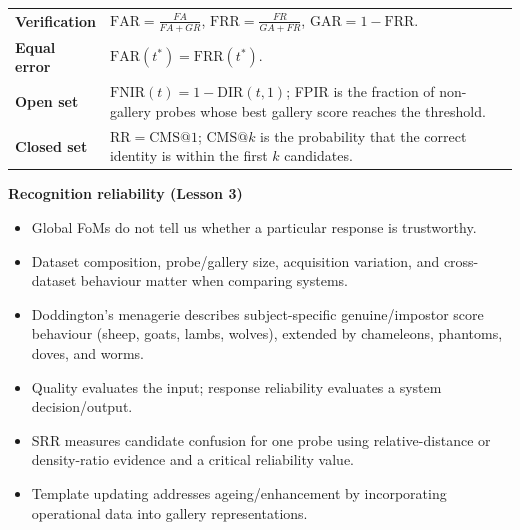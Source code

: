 \documentclass[11pt,a4paper,oneside]{report}
\begin{document}
\begin{remarkbox}
\small
\begin{tabularx}{\linewidth}{>{\bfseries}P{3.0cm} X}
Verification &
\(\displaystyle \mathrm{FAR}=\frac{FA}{FA+GR}\),\quad
\(\displaystyle \mathrm{FRR}=\frac{FR}{GA+FR}\),\quad
\(\mathrm{GAR}=1-\mathrm{FRR}\). \\
\addlinespace[2pt]
Equal error &
\(\mathrm{FAR}(t^\ast)=\mathrm{FRR}(t^\ast)\). \\
\addlinespace[2pt]
Open set &
\(\mathrm{FNIR}(t)=1-\mathrm{DIR}(t,1)\); FPIR is the fraction of non-gallery probes whose best gallery score reaches the threshold. \\
\addlinespace[2pt]
Closed set &
\(\mathrm{RR}=\mathrm{CMS}@1\); \(\mathrm{CMS}@k\) is the probability that the correct identity is within the first \(k\) candidates. \\
\end{tabularx}
\normalsize
\end{remarkbox}


\clearpage
\begin{keyconcept}
\textbf{Recognition reliability (Lesson 3)}
\begin{itemize}[leftmargin=*,itemsep=0.18em,topsep=0.25em]
    \item Global FoMs do not tell us whether a particular response is trustworthy.
    \item Dataset composition, probe/gallery size, acquisition variation, and cross-dataset behaviour matter when comparing systems.
    \item Doddington's menagerie describes subject-specific genuine/impostor score behaviour (sheep, goats, lambs, wolves), extended by chameleons, phantoms, doves, and worms.
    \item Quality evaluates the input; response reliability evaluates a system decision/output.
    \item SRR measures candidate confusion for one probe using relative-distance or density-ratio evidence and a critical reliability value.
    \item Template updating addresses ageing/enhancement by incorporating operational data into gallery representations.
\end{itemize}
\end{keyconcept}
\end{document}
